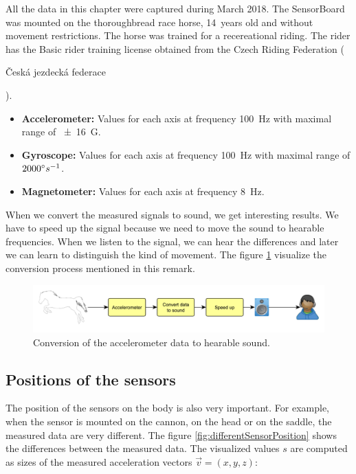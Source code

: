 All the data in this chapter were captured during March 2018. The SensorBoard was mounted on the thoroughbread race horse, 14~years old and without movement restrictions. The horse was trained for a recereational riding. The rider has the Basic rider training license obtained from the Czech Riding Federation (\begin{otherlanguage}{czech}Česká jezdecká federace\end{otherlanguage}).

\begin{itemize}
    \item \textbf{Accelerometer:} Values for each axis at frequency \SI{100}{Hz} with maximal range of \SI{\pm 16}{G}.
    \item \textbf{Gyroscope:} Values for each axis at frequency \SI{100}{Hz} with maximal range of $2000 \degree s^{-1}$.
    \item \textbf{Magnetometer:} Values for each axis at frequency \SI{8}{Hz}.
\end{itemize}

\begin{remark}
    When we convert the measured signals to sound, we get interesting results. We have to speed up the signal because we need to move the sound to hearable frequencies. When we listen to the signal, we can hear the differences and later we can learn to distinguish the kind of movement. The figure \ref{accToSound} visualize the conversion process mentioned in this remark.
    
    \begin{figure}[H]
        \centering
        \caption{Conversion of the accelerometer data to hearable sound.}
        \label{accToSound}
        \includegraphics[width=\linewidth]{img/accToSound.pdf}
    \end{figure}
\end{remark}

\subsection{Positions of the sensors}
The position of the sensors on the body is also very important. For example, when the sensor is mounted on the cannon, on the head or on the saddle, the measured data are very different. The figure \ref{fig:differentSensorPosition} shows the differences between the measured data. The visualized values $s$ are computed as sizes of the measured acceleration vectors $\vec{v} = (x,y,z)$:

